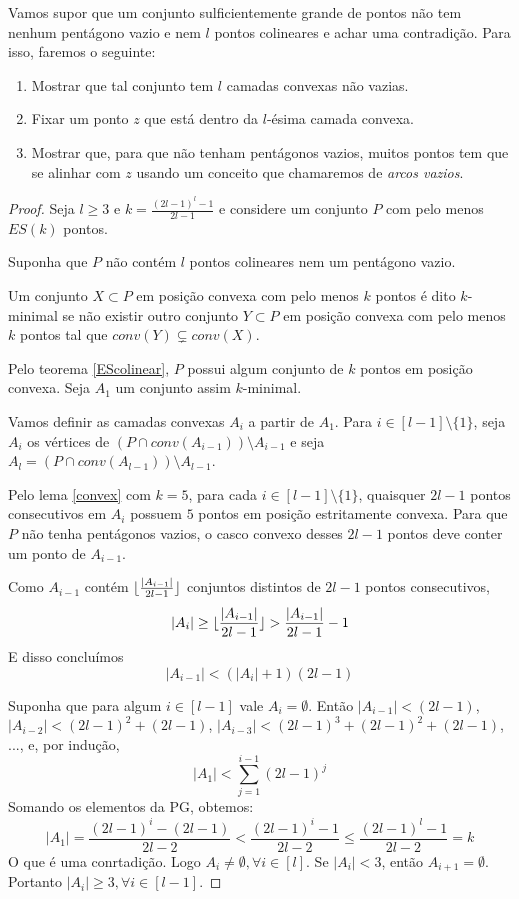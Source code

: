 \documentclass[a4paper]{book}
\DeclarePairedDelimiter\floor{\lfloor}{\rfloor}
\begin{document}
Vamos supor que um conjunto sulficientemente grande de pontos não tem nenhum pentágono vazio e nem $l$ pontos colineares e achar uma contradição. Para isso, faremos o seguinte:
\begin{enumerate}
    \item Mostrar que tal conjunto tem $l$ camadas convexas não vazias.
    \item Fixar um ponto $z$ que está dentro da $l$-ésima camada convexa.
    \item Mostrar que, para que não tenham pentágonos vazios, muitos pontos tem que se alinhar com $z$ usando um conceito que chamaremos de \textit{arcos vazios}.
\end{enumerate}

\begin{proof}
    Seja $l\geq 3$ e $k=\frac{(2l-1)^l-1}{2l-1}$ e considere um conjunto $P$ com pelo menos $ES(k)$ pontos.

    Suponha que $P$ não contém $l$ pontos colineares nem um pentágono vazio.

    Um conjunto $X\subset P$ em posição convexa com pelo menos $k$ pontos é dito $k$-minimal se não existir outro conjunto $Y\subset P$ em posição convexa com pelo menos $k$ pontos tal que $conv(Y)\subsetneq conv(X)$.

    Pelo teorema \ref{EScolinear}, $P$ possui algum conjunto de $k$ pontos em posição convexa. Seja $A_1$ um conjunto assim $k$-minimal.

    Vamos definir as camadas convexas $A_i$ a partir de $A_1$.
    Para $i\in[l-1]\setminus\{1\}$, seja $A_i$ os vértices de $(P\cap conv(A_{i-1})) \setminus A_{i-1}$ e seja $A_l=(P\cap conv(A_{l-1}))\setminus A_{l-1}$.

    Pelo lema \ref{convex} com $k=5$, para cada $i\in[l-1]\setminus\{1\}$, quaisquer $2l-1$ pontos consecutivos em $A_i$ possuem $5$ pontos em posição estritamente convexa. Para que $P$ não tenha pentágonos vazios, o casco convexo desses $2l-1$ pontos deve conter um ponto de $A_{i-1}$.

    Como $A_{i-1}$ contém $\floor{\frac{|A_{i-1}|}{2l-1}}$ conjuntos distintos de $2l-1$ pontos consecutivos,
    $$|A_i|\geq\floor{\frac{|A_{i-1}|}{2l-1}}>\frac{|A_{i-1}|}{2l-1}-1$$
    E disso concluímos
    $$|A_{i-1}|<(|A_i|+1)(2l-1)$$

    Suponha que para algum $i\in[l-1]$ vale $A_i=\emptyset$. Então $|A_{i-1}| < (2l-1)$, $|A_{i-2}| < (2l-1)^2 + (2l-1)$, $|A_{i-3}| < (2l-1)^3 + (2l-1)^2 + (2l-1)$, ..., e, por indução, 
    $$|A_1|<\sum_{j=1}^{i-1}(2l-1)^j$$
    Somando os elementos da PG, obtemos:
    $$|A_1|=\frac{(2l-1)^i-(2l-1)}{2l-2}<\frac{(2l-1)^i-1}{2l-2}\leq\frac{(2l-1)^l-1}{2l-2}=k$$
    O que é uma conrtadição. Logo $A_i\neq\emptyset, \forall i \in [l]$. Se $|A_i| < 3$, então $A_{i+1}=\emptyset$. Portanto $|A_i|\geq 3,\forall i \in [l-1]$.


\end{proof}
\end{document}

